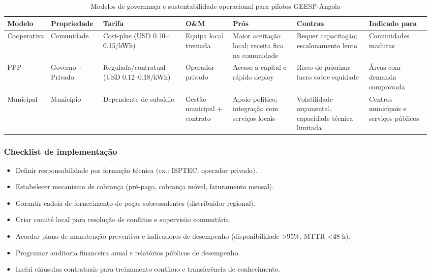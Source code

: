 \documentclass[12pt, a4paper]{article}
\begin{document}
\begin{table}[ht]
\centering
\caption{Modelos de governança e sustentabilidade operacional para pilotos GEESP-Angola}
\label{tab:governance_models}
\begin{tabular}{|l|l|l|l|p{3.2cm}|p{3.2cm}|l|}
\hline
\textbf{Modelo} & \textbf{Propriedade} & \textbf{Tarifa} & \textbf{O\&M} & \textbf{Prós} & \textbf{Contras} & \textbf{Indicado para} \\
\hline
Cooperativa & Comunidade & Cost-plus (USD 0.10--0.15/kWh) & Equipa local treinada & Maior aceitação local; receita fica na comunidade & Requer capacitação; escalonamento lento & Comunidades maduras \\
\hline
PPP & Governo + Privado & Regulada/contratual (USD 0.12--0.18/kWh) & Operador privado & Acesso a capital e rápido deploy & Risco de priorizar lucro sobre equidade & Áreas com demanda comprovada \\
\hline
Municipal & Município & Dependente de subsídio & Gestão municipal + contrato & Apoio político; integração com serviços locais & Volatilidade orçamental; capacidade técnica limitada & Centros municipais e serviços públicos \\
\hline
\end{tabular}
\end{table}

\subsubsection*{Checklist de implementação}
\begin{itemize}
  \item Definir responsabilidade por formação técnica (ex.: ISPTEC, operador privado).
  \item Estabelecer mecanismo de cobrança (pré-pago, cobrança móvel, faturamento mensal).
  \item Garantir cadeia de fornecimento de peças sobressalentes (distribuidor regional).
  \item Criar comité local para resolução de conflitos e supervisão comunitária.
  \item Acordar plano de manutenção preventiva e indicadores de desempenho (disponibilidade >95\%, MTTR <48 h).
  \item Programar auditoria financeira anual e relatórios públicos de desempenho.
  \item Inclui cláusulas contratuais para treinamento contínuo e transferência de conhecimento.
\end{itemize}
\end{document}
